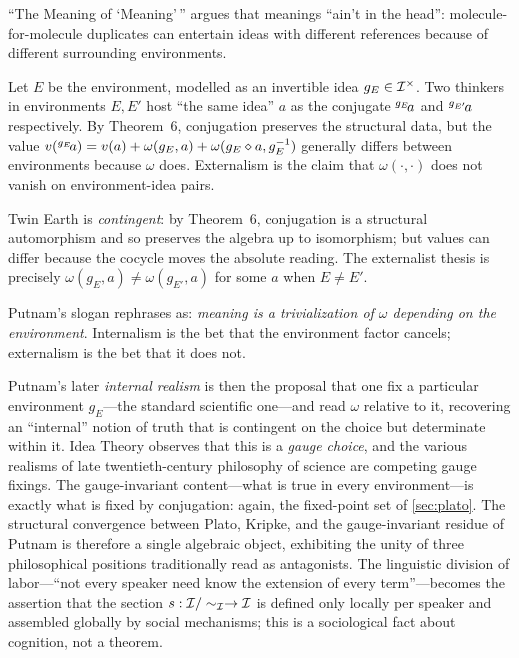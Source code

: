  ``The Meaning of `Meaning'\,''
\cite{Putnam1975} argues that meanings ``ain't in the head'': molecule-
for-molecule duplicates can entertain ideas with different references
because of different surrounding environments.

\formalclaim Let $E$ be the environment, modelled as an invertible
idea $g_E\in\mathcal{I}^{\times}$. Two thinkers in environments $E, E'$ host
``the same idea'' $a$ as the conjugate ${}^{g_E}\!a$ and
${}^{g_{E'}}\!a$ respectively. By Theorem~6, conjugation preserves
the structural data, but the value $v({}^{g_E}\!a) = v(a) +
\omega(g_E, a) + \omega(g_E\mathbin{\diamond} a, g_E^{-1})$ generally differs
between environments because $\omega$ does. Externalism is the claim
that $\omega(\cdot, \cdot)$ does not vanish on environment-idea
pairs.

\formalstatus Twin Earth is \emph{contingent}: by Theorem~6,
conjugation is a structural automorphism and so preserves the algebra
up to isomorphism; but values can differ because the cocycle moves the
absolute reading. The externalist thesis is precisely $\omega(g_E, a)
\neq \omega(g_{E'}, a)$ for some $a$ when $E \neq E'$.

\litcomment Putnam's slogan rephrases as: \emph{meaning is a
trivialization of $\omega$ depending on the environment}. Internalism
is the bet that the environment factor cancels; externalism is the bet
that it does not.

Putnam's later \emph{internal realism} is then the proposal that one
fix a particular environment $g_E$---the standard scientific one---and
read $\omega$ relative to it, recovering an ``internal'' notion of
truth that is contingent on the choice but determinate within it. Idea
Theory observes that this is a \emph{gauge choice}, and the various
realisms of late twentieth-century philosophy of science are competing
gauge fixings. The gauge-invariant content---what is true in every
environment---is exactly what is fixed by conjugation: again, the
fixed-point set of \cref{sec:plato}. The structural convergence
between Plato, Kripke, and the gauge-invariant residue of Putnam is
therefore a single algebraic object, exhibiting the unity of three
philosophical positions traditionally read as antagonists. The
linguistic division of labor---``not every speaker need know the
extension of every term''---becomes the assertion that the section
$s : \mathcal{I}/\sim_{\mathcal{I}}\to\mathcal{I}$ is defined only locally per speaker
and assembled globally by social mechanisms; this is a sociological
fact about cognition, not a theorem.

